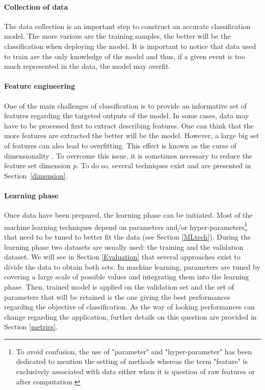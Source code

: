 \documentclass[a4paper,10pt]{article}
\begin{document}
\paragraph{Collection of data} 
The data collection is an important step to construct an accurate classification model. The more various are the training samples, the better will be the classification when deploying the model. It is important to notice that data used to train are the only knowledge of the model and thus, if a given event is too much represented in the data, the model may overfit.

\paragraph{Feature engineering}
One of the main challenges of classification is to provide an informative set of features regarding the targeted outputs of the model. In some cases, data may have to be processed first to extract describing features. One can think that the more features are extracted the better will be the model. However, a large big set of features can also lead to overfitting. This effect is known as the curse of dimensionality \cite{tang2014feature}. To overcome this issue, it is sometimes necessary to reduce the feature set dimension $p$. To do so, several techniques exist and are presented in Section~\ref{dimension}.

\paragraph{Learning phase}
Once data have been prepared, the learning phase can be initiated. Most of the machine learning techniques depend on parameters and/or hyper-parameters\footnote{To avoid confusion, the use of "parameter" and "hyper-parameter" has been dedicated to mention the setting of methods whereas the term "feature" is exclusively associated with data either when it is question of raw features or after computation.} that need to be tuned to better fit the data (see  Section \ref{MLtech}). During the learning phase two datasets are usually used: the training and the validation dataset. We will see in Section \ref{Evaluation} that several approaches exist to divide the data to obtain both sets. In machine learning, parameters are tuned by covering a large scale of possible values and integrating them into the learning phase. Then, trained model is applied on the validation set and the set of parameters that will be retained is the one giving the best performances regarding the objective of classification. As the way of looking performances can change regarding the application, further details on this question are provided in Section \ref{metrics}.
\end{document}

